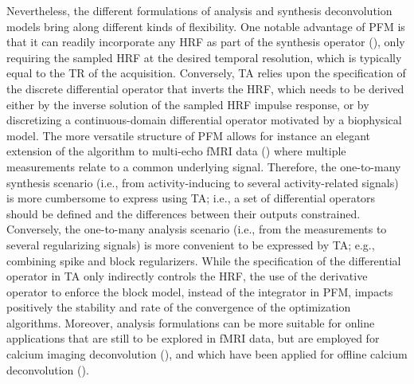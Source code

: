 Nevertheless, the different formulations of analysis and synthesis deconvolution models bring along different kinds of flexibility. One notable advantage of PFM is that it can readily incorporate any HRF as part of the synthesis operator (\citealt{Elad2007Analysisversussynthesis}), only requiring the sampled HRF at the desired temporal resolution, which is typically equal to the TR of the acquisition. Conversely, TA relies upon the specification of the discrete differential operator that inverts the HRF, which needs to be derived either by the inverse solution of the sampled HRF impulse response, or by discretizing a continuous-domain differential operator motivated by a biophysical model. The more versatile structure of PFM allows for instance an elegant extension of the algorithm to multi-echo fMRI data (\citealt{CaballeroGaudes2019deconvolutionalgorithmmulti}) where multiple measurements relate to a common underlying signal. Therefore, the one-to-many synthesis scenario (i.e., from activity-inducing to several activity-related signals) is more cumbersome to express using TA; i.e., a set of differential operators should be defined and the differences between their outputs constrained. Conversely, the one-to-many analysis scenario (i.e., from the measurements to several regularizing signals) is more convenient to be expressed by TA; e.g., combining spike and block regularizers. 
While the specification of the differential operator in TA only indirectly controls the HRF, the use of the derivative operator to enforce the block model, instead of the integrator in PFM, impacts positively the stability and rate of the convergence of the optimization algorithms. Moreover, analysis formulations can be more suitable for online applications that are still to be explored in fMRI data, but are employed for calcium imaging deconvolution (\citealt{Friedrich_2017,Jewell_2019}), and which have been applied for offline calcium deconvolution (\citealt{Farouj2020DeconvolutionSustainedNeural}).

